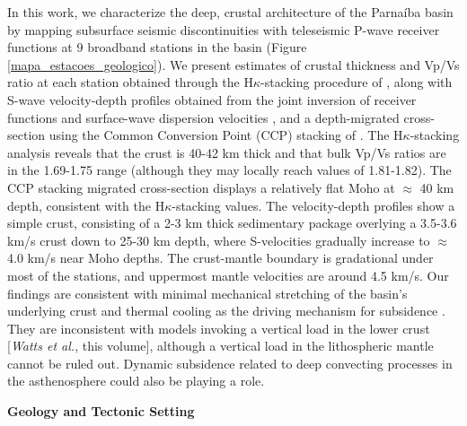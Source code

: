 \documentclass[paper,11pt]{geophysics}
\begin{document}
In this work, we characterize the deep, crustal architecture of the Parnaíba basin by mapping subsurface seismic discontinuities with teleseismic P-wave receiver functions \citep{langston_structure_1979} at 9 broadband stations in the basin (Figure \ref{mapa_estacoes_geologico}). We present estimates of crustal thickness and Vp/Vs ratio at each station obtained through the H$\kappa$-stacking procedure of \citep{zhu_moho_2000}, along with S-wave velocity-depth profiles obtained from the joint inversion of receiver functions and surface-wave dispersion velocities \citep{julia_joint_2000,julia_lithospheric_2003}, and a depth-migrated cross-section using the Common Conversion Point (CCP) stacking of \citep{frassetto_improved_2010}. The H$\kappa$-stacking analysis reveals that the crust is 40-42 km thick and that bulk Vp/Vs ratios are in the 1.69-1.75 range (although they may locally reach values of 1.81-1.82). The CCP stacking migrated cross-section displays a relatively flat Moho at $\approx$ 40 km depth, consistent with the H$\kappa$-stacking values. The velocity-depth profiles show a simple crust, consisting of a 2-3 km thick sedimentary package overlying a 3.5-3.6 km/s crust down to 25-30 km depth, where S-velocities gradually increase to $\approx$ 4.0 km/s near Moho depths. The crust-mantle boundary is gradational under most of the stations, and uppermost mantle velocities are around 4.5 km/s. Our findings are consistent with minimal mechanical stretching of the basin's underlying crust and thermal cooling as the driving mechanism for subsidence \citep{daly_brasiliano_2014}. They are inconsistent with models invoking a vertical load in the lower crust [\textit{\LARGE Watts et al.}, this volume], although a vertical load in the lithospheric mantle cannot be ruled out. Dynamic subsidence related to deep convecting processes in the asthenosphere could also be playing a role.
\linebreak
\linebreak

\begin{flushleft}
\textbf{\LARGE Geology and Tectonic Setting}
\end{flushleft}
\end{document}
